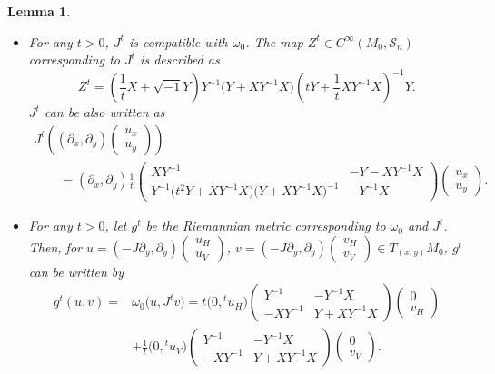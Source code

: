 \documentclass[pdftex]{sigma}
\numberwithin{equation}{section}
\newtheorem{Lemma}[Theorem]{Lemma}
\begin{document}
\begin{Lemma}\label{compatibility2}\quad
\begin{itemize}\itemsep=0pt
\item[$(1)$] For any $t>0$, $J^t$ is compatible with $\omega_0$. The map $Z^t\in C^\infty ( M_0,{\mathcal S}_n)$ corresponding to $J^t$ is described as
\begin{equation*}
Z^t=\left(\frac{1}{t}X+\sqrt{-1}Y\right)Y^{-1}\bigl(Y+XY^{-1}X\bigr)\left(tY+\frac{1}{t}XY^{-1}X\right)^{-1}Y.
\end{equation*}
$J^t$ can be also written as
\begin{gather*}
J^t\left((\partial_x, \partial_y)
\begin{pmatrix}
u_x \\
u_y
\end{pmatrix}\right)\\
\qquad=(\partial_x, \partial_y)
\frac{1}{t}
\begin{pmatrix}
XY^{-1} & -Y-XY^{-1}X \\
Y^{-1}\bigl(t^2Y+XY^{-1}X\bigr)\bigl(Y+XY^{-1}X\bigr)^{-1} & -Y^{-1}X
\end{pmatrix}
\begin{pmatrix}
u_x \\
u_y
\end{pmatrix}.
\end{gather*}
\item[$(2)$] For any $t>0$, let $g^t$ be the Riemannian metric corresponding to $\omega_0$ and $J^t$. Then, for $u=(-J\partial_y, \partial_y)
\left(\begin{smallmatrix}
u_H\\
u_V
\end{smallmatrix}\right)$, $v=(-J\partial_y, \partial_y)
\left(\begin{smallmatrix}
v_H\\
v_V
\end{smallmatrix}\right)
\in T_{(x,y)}M_0$, $g^t$ can be written by
\begin{align*}
g^t(u,v)={}&\omega_0\bigl( u,J^tv \bigr)
= t\bigl(0,{}^tu_H\bigr)
\begin{pmatrix}
Y^{-1} & -Y^{-1}X \\
-XY^{-1} & Y+XY^{-1}X
\end{pmatrix}
\begin{pmatrix}
0\\
v_H
\end{pmatrix}
\\
&
+\frac{1}{t}\bigl(0,{}^tu_V\bigr)
\begin{pmatrix}
Y^{-1} & -Y^{-1}X \\
-XY^{-1} & Y+XY^{-1}X
\end{pmatrix}
\begin{pmatrix}
0\\
v_V
\end{pmatrix}.
\end{align*}
\end{itemize}
\end{Lemma}
\end{document}
